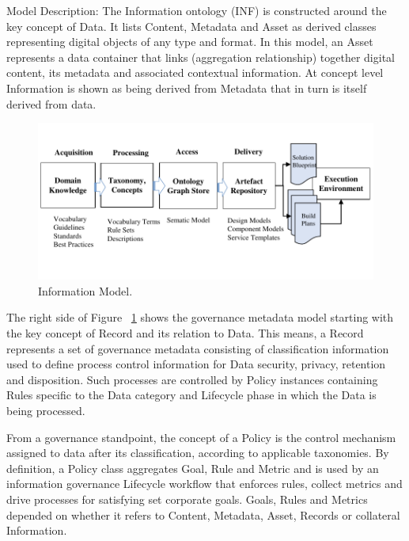\documentclass[runningheads]{llncs}
\begin{document}
Model Description: The Information ontology (INF) is constructed around the key concept of Data. It lists Content, Metadata and Asset as derived classes representing digital objects of any type and format. In this model, an Asset represents a data container that links (aggregation relationship) together digital content, its metadata and associated contextual information. At concept level Information is shown as being derived from Metadata that in turn is itself derived from data. 

 \begin{figure}[h] 
 \centering
\includegraphics[page=6,trim=0 1cm 0 0.5cm,clip, width=\textwidth]{figs/IGSModelsMedium.pdf}
\caption{Information Model.} \label{fig6}
\end{figure}

The right side of Figure ~\ref{fig6} shows the governance metadata model starting with the key concept of Record and its relation to Data. This means, a Record represents a set of governance metadata consisting of classification information used to define process control information for Data security, privacy, retention and disposition. Such processes are controlled by Policy instances containing Rules specific to the Data category and Lifecycle phase in which the Data is being processed. 

From a governance standpoint, the concept of a Policy is the control mechanism assigned to data after its classification, according to applicable taxonomies. 
By definition, a Policy class aggregates Goal, Rule and Metric and is used by an information governance Lifecycle workflow that enforces rules, collect metrics and drive processes for satisfying set corporate goals. Goals, Rules and Metrics depended on whether it refers to Content, Metadata, Asset, Records or collateral Information. 
\end{document}
